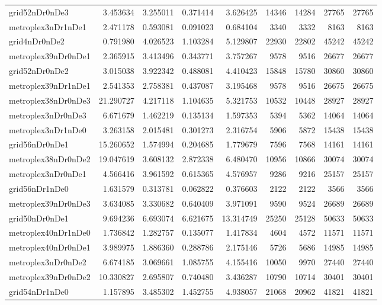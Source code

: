 \begin{longtable}{|l|r|r|r|r|r|r|r|r|}
grid52nDr0nDe3 & 3.453634 & 3.255011 & 0.371414 & 3.626425 & 14346 & 14284 & 27765 & 27765 \\
metroplex3nDr1nDe1 & 2.471178 & 0.593081 & 0.091023 & 0.684104 & 3340 & 3332 & 8163 & 8163 \\
grid4nDr0nDe2 & 0.791980 & 4.026523 & 1.103284 & 5.129807 & 22930 & 22802 & 45242 & 45242 \\
metroplex39nDr0nDe1 & 2.365915 & 3.413496 & 0.343771 & 3.757267 & 9578 & 9516 & 26677 & 26677 \\
grid52nDr0nDe2 & 3.015038 & 3.922342 & 0.488081 & 4.410423 & 15848 & 15780 & 30860 & 30860 \\
metroplex39nDr1nDe1 & 2.541353 & 2.758381 & 0.437087 & 3.195468 & 9578 & 9516 & 26675 & 26675 \\
metroplex38nDr0nDe3 & 21.290727 & 4.217118 & 1.104635 & 5.321753 & 10532 & 10448 & 28927 & 28927 \\
metroplex3nDr0nDe3 & 6.671679 & 1.462219 & 0.135134 & 1.597353 & 5394 & 5362 & 14064 & 14064 \\
metroplex3nDr1nDe0 & 3.263158 & 2.015481 & 0.301273 & 2.316754 & 5906 & 5872 & 15438 & 15438 \\
grid56nDr0nDe1 & 15.260652 & 1.574994 & 0.204685 & 1.779679 & 7596 & 7568 & 14161 & 14161 \\
metroplex38nDr0nDe2 & 19.047619 & 3.608132 & 2.872338 & 6.480470 & 10956 & 10866 & 30074 & 30074 \\
metroplex3nDr0nDe1 & 4.566416 & 3.961592 & 0.615365 & 4.576957 & 9286 & 9216 & 25157 & 25157 \\
grid56nDr1nDe0 & 1.631579 & 0.313781 & 0.062822 & 0.376603 & 2122 & 2122 & 3566 & 3566 \\
metroplex39nDr0nDe3 & 3.634085 & 3.330682 & 0.640409 & 3.971091 & 9590 & 9524 & 26689 & 26689 \\
grid50nDr0nDe1 & 9.694236 & 6.693074 & 6.621675 & 13.314749 & 25250 & 25128 & 50633 & 50633 \\
metroplex40nDr1nDe0 & 1.736842 & 1.282757 & 0.135077 & 1.417834 & 4604 & 4572 & 11571 & 11571 \\
metroplex40nDr0nDe1 & 3.989975 & 1.886360 & 0.288786 & 2.175146 & 5726 & 5686 & 14985 & 14985 \\
metroplex3nDr0nDe2 & 6.674185 & 3.069661 & 1.085755 & 4.155416 & 10050 & 9970 & 27440 & 27440 \\
metroplex39nDr0nDe2 & 10.330827 & 2.695807 & 0.740480 & 3.436287 & 10790 & 10714 & 30401 & 30401 \\
grid54nDr1nDe0 & 1.157895 & 3.485302 & 1.452755 & 4.938057 & 21068 & 20962 & 41821 & 41821 \\

\end{longtable}
